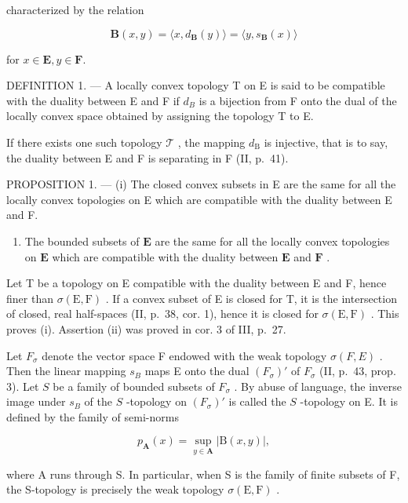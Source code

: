 characterized by the relation

\[
\mathbf {B} (x, y) = \langle x, d _ {\mathbf {B}} (y) \rangle = \langle y, s _ {\mathbf {B}} (x) \rangle\tag{1}
\]

for \(x\in \mathbf{E},y\in \mathbf{F}.\)

DEFINITION 1. --- A locally convex topology T on E is said to be compatible with the duality between E and F if \(d_{B}\) is a bijection from F onto the dual of the locally convex space obtained by assigning the topology T to E.

If there exists one such topology \(\mathcal{T}\) , the mapping \(d_{\mathrm{B}}\) is injective, that is to say, the duality between E and F is separating in F (II, p.~41).

PROPOSITION 1. --- (i) The closed convex subsets in E are the same for all the locally convex topologies on E which are compatible with the duality between E and F.

\begin{enumerate}
\def\labelenumi{(\roman{enumi})}
\setcounter{enumi}{1}
\tightlist
\item
  The bounded subsets of \(\mathbf{E}\) are the same for all the locally convex topologies on \(\mathbf{E}\) which are compatible with the duality between \(\mathbf{E}\) and \(\mathbf{F}\) .
\end{enumerate}

Let T be a topology on E compatible with the duality between E and F, hence finer than \(\sigma(\mathrm{E},\mathrm{F})\) . If a convex subset of E is closed for T, it is the intersection of closed, real half-spaces (II, p.~38, cor. 1), hence it is closed for \(\sigma(\mathrm{E},\mathrm{F})\) . This proves (i). Assertion (ii) was proved in cor. 3 of III, p.~27.

Let \(F_{\sigma}\) denote the vector space F endowed with the weak topology \(\sigma(F, E)\) . Then the linear mapping \(s_{B}\) maps E onto the dual \((F_{\sigma})'\) of \(F_{\sigma}\) (II, p.~43, prop. 3). Let \(S\) be a family of bounded subsets of \(F_{\sigma}\) . By abuse of language, the inverse image under \(s_{B}\) of the \(S\) -topology on \((F_{\sigma})'\) is called the \(S\) -topology on E. It is defined by the family of semi-norms

\[
p _ {\mathbf {A}} (x) = \sup _ {y \in \mathbf {A}} | \mathrm{B} (x, y) |,\tag{2}
\]

where A runs through S. In particular, when S is the family of finite subsets of F, the S-topology is precisely the weak topology \(\sigma(\mathrm{E}, \mathrm{F})\) .

